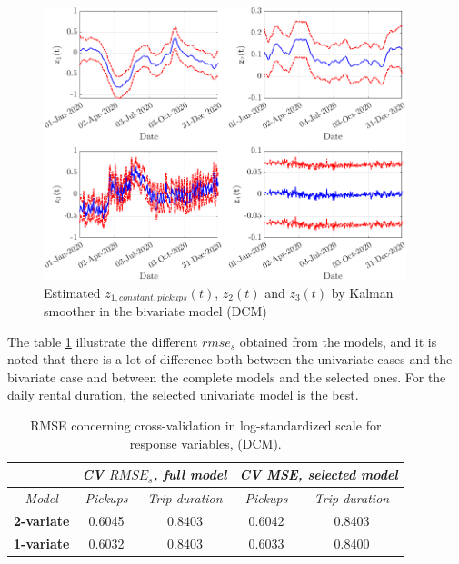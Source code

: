 \begin{figure}[h!]
	\centering
	\includegraphics[height=300px]{Images/Data analysis/DCM/trend_z_bivariate_selected_DCM.png}
	\caption[Estimated $z_{1,constant,pick}(t)$,  $z_{2,distance,pick}(t)$ , $z_{3,constant,duration}(t)$ and $z_{4,distance,duration}(t)$ by Kalman smoother in the bivariate model (DCM)]{Estimated $z_{1,constant,pickups}(t)$,  $z_{2}(t)$ and $z_{3}(t)$ by Kalman smoother in the bivariate model (DCM)}
	\label{Trend_zeta_latente_biv}
\end{figure}
\noindent

The table \ref{Cross-validation rmse_s DCM} illustrate the different $rmse_{s}$ obtained from the models, and it is noted that there is a lot of difference both between the univariate cases and the bivariate case and between the complete models and the selected ones. For the daily rental duration, the selected univariate model is the best.

\begin{table}[h!]
	\centering
	\renewcommand\arraystretch{1.3}
	\begin{tabular}{c|cc|cc}
		\hline
		\multicolumn{1}{l|}{} & \multicolumn{2}{c|}{\textit{CV $RMSE_{s}$, full model}} & \multicolumn{2}{c}{\textit{CV MSE, selected model} }\\ 
		\hline
		\textit{Model} & \multicolumn{1}{c|}{\textit{Pickups}} & \textit{Trip duration} & \multicolumn{1}{c|}{\textit{Pickups}} & \textit{Trip duration} \\ 
		\hline
		\textbf{2-variate } & \multicolumn{1}{c|}{0.6045}  & 0.8403   & \multicolumn{1}{c|}{0.6042}  & 0.8403   \\ 
		\hline
		\textbf{1-variate } & \multicolumn{1}{c|}{0.6032}  & 0.8403   & \multicolumn{1}{c|}{0.6033}  & 0.8400   \\ 
		\hline
	\end{tabular}
	\caption[RMSE concerning cross-validation in log-standardized scale for response variables, (DCM))]{RMSE concerning cross-validation in log-standardized scale for response variables, (DCM).}
	\label{Cross-validation rmse_s DCM}
\end{table}